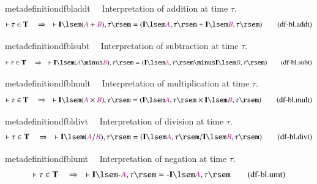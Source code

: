 \begin{restatable}{metadefinition}{dfbladdt}~~ Interpretation of addition at time
$\tau$.
\begin{align}
\vdash \tau \in \mathbf{T}\quad\Rightarrow\quad \vdash \mathbf{I} \lsem (
    \mc{A} + \mc{B} ) , \tau \rsem = ( \mathbf{I} \lsem \mc{A} , \tau \rsem +
    \mathbf{I} \lsem \mc{B} , \tau \rsem )\label{eq:df-bl.addt}\tag{df-bl.addt}
\end{align}
\end{restatable}

\begin{restatable}{metadefinition}{dfblsubt}~~ Interpretation of subtraction at time
$\tau$.
\begin{align}
\vdash \tau \in \mathbf{T}\quad\Rightarrow\quad \vdash \mathbf{I} \lsem (
    \mc{A} \minus \mc{B} ) , \tau \rsem = ( \mathbf{I} \lsem \mc{A} , \tau
    \rsem \minus \mathbf{I} \lsem \mc{B} , \tau \rsem
    )\label{eq:df-bl.subt}\tag{df-bl.subt}
\end{align}
\end{restatable}

\begin{restatable}{metadefinition}{dfblmult}~~ Interpretation of multiplication at
time $\tau$.
\begin{align}
\vdash \tau \in \mathbf{T}\quad\Rightarrow\quad \vdash \mathbf{I} \lsem (
    \mc{A} \times \mc{B} ) , \tau \rsem = ( \mathbf{I} \lsem \mc{A} , \tau \rsem
    \times \mathbf{I} \lsem \mc{B} , \tau \rsem
    )\label{eq:df-bl.mult}\tag{df-bl.mult}
\end{align}
\end{restatable}

\begin{restatable}{metadefinition}{dfbldivt}~~ Interpretation of division at time
$\tau$.
\begin{align}
\vdash \tau \in \mathbf{T}\quad\Rightarrow\quad \vdash \mathbf{I} \lsem (
    \mc{A} / \mc{B} ) , \tau \rsem = ( \mathbf{I} \lsem \mc{A} , \tau \rsem /
    \mathbf{I} \lsem \mc{B} , \tau \rsem )\label{eq:df-bl.divt}\tag{df-bl.divt}
\end{align}
\end{restatable}

\begin{restatable}{metadefinition}{dfblumt}~~ Interpretation of negation at time
$\tau$.
\begin{align}
\vdash \tau \in \mathbf{T}\quad\Rightarrow\quad \vdash \mathbf{I} \lsem
    \textrm{-} \mc{A} , \tau \rsem = \textrm{-} \mathbf{I} \lsem \mc{A} , \tau
    \rsem\label{eq:df-bl.umt}\tag{df-bl.umt}
\end{align}
\end{restatable}

